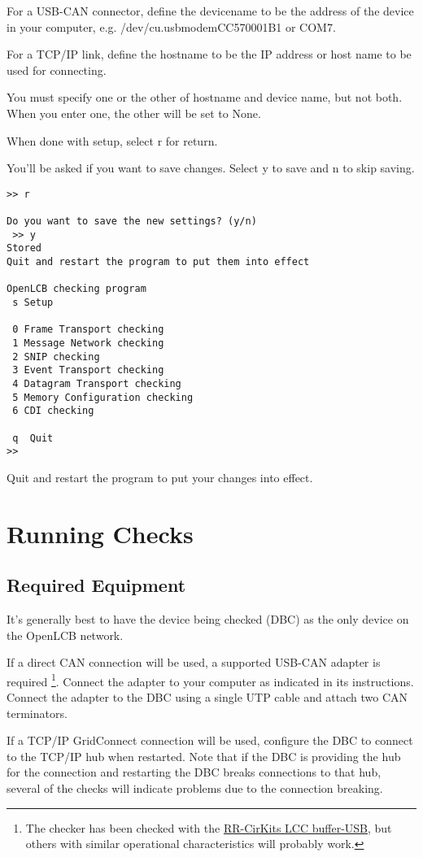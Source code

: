 \documentclass[11pt]{article}
\begin{document}
For a USB-CAN connector, define the devicename to be the address of the device in your computer, 
e.g. /dev/cu.usbmodemCC570001B1 or COM7.

For a TCP/IP link, define the hostname to be the IP address or host name to be used 
for connecting.

You must specify one or the other of hostname and device name, but not both.
When you enter one, the other will be set to None.

When done with setup, select r for return.  

You'll be asked if you want to save changes.  
Select y to save and n to skip saving.

\begin{verbatim}
>> r

Do you want to save the new settings? (y/n)
 >> y
Stored
Quit and restart the program to put them into effect

OpenLCB checking program
 s Setup

 0 Frame Transport checking
 1 Message Network checking
 2 SNIP checking
 3 Event Transport checking
 4 Datagram Transport checking
 5 Memory Configuration checking
 6 CDI checking
  
 q  Quit
>> 
\end{verbatim}

Quit and restart the program to put your changes into effect.

\section{Running Checks}

\subsection{Required Equipment}

It's generally best to have the device being checked (DBC) 
as the only device on the OpenLCB network. 

If a direct CAN connection will be used,
a supported USB-CAN adapter is required
\footnote{The checker has been checked with the
\href{https://www.rr-cirkits.com/description/LCC-usb-flyer.pdf}{RR-CirKits LCC buffer-USB},
but others with similar operational characteristics will probably work.
}. 
Connect the adapter to your computer as indicated in its instructions.
Connect the adapter to the DBC using a single UTP cable
and attach two CAN terminators.

If a TCP/IP GridConnect connection will be used, 
configure the DBC to connect to the TCP/IP hub when restarted. Note that if 
the DBC is providing the hub for the connection and restarting the DBC
breaks connections to that hub, several of the checks will indicate problems
due to the connection breaking.
\end{document}
